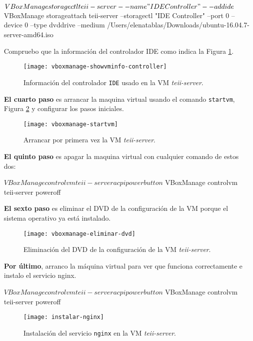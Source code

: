 \begin{listing}[style=consola]
    $ VBoxManage storagectl teii-server --name "IDE Controller" --add ide
    $ VBoxManage storageattach teii-server --storagectl "IDE Controller" --port 0  --device 0 --type dvddrive --medium /Users/elenatablas/Downloads/ubuntu-16.04.7-server-amd64.iso
\end{listing}
\par Compruebo que la información del controlador IDE como indica la Figura \ref{fig:vboxmanage-showvminfo-controller}.
\begin{figure}[H]
    \texttt{[image: vboxmanage-showvminfo-controller]}
    \centering
    \caption{Información del controlador \texttt{IDE} usado en la VM \textit{teii-server}.}
    \label{fig:vboxmanage-showvminfo-controller}
 \end{figure}
 \par \textbf{El cuarto paso} es arrancar la maquina virtual usando el comando \texttt{startvm}, Figura \ref{fig:vboxmanage-startvm} 
 y configurar los pasos iniciales.
\begin{figure}[H]
    \texttt{[image: vboxmanage-startvm]}
    \centering
    \caption{Arrancar por primera vez la VM \textit{teii-server}.}
    \label{fig:vboxmanage-startvm}
\end{figure}
\par \textbf{El quinto paso} es apagar la maquina virtual con cualquier comando de estos dos:
\begin{listing}[style=consola]
    $ VBoxManage controlvm teii-server acpipowerbutton
    $ VBoxManage controlvm teii-server poweroff
\end{listing}
\par \textbf{El sexto paso} es eliminar el DVD de la configuración de la VM porque el sistema operativo ya está instalado.
 \begin{figure}[H]
    \texttt{[image: vboxmanage-eliminar-dvd]}
    \centering
    \caption{Eliminación del DVD de la configuración de la VM \textit{teii-server}.}
    \label{fig:vboxmanage-eliminar-dvd}
\end{figure}
\par \textbf{Por último}, arranco la máquina virtual para ver que funciona correctamente e instalo el servicio nginx.
\begin{listing}[style=consola]
    $ VBoxManage controlvm teii-server acpipowerbutton
    $ VBoxManage controlvm teii-server poweroff
\end{listing}
 \begin{figure}[H]
    \texttt{[image: instalar-nginx]}
    \centering
    \caption{Instalación del servicio \texttt{nginx} en la VM \textit{teii-server}.}
    \label{fig:instalar-nginx}
\end{figure}
 
